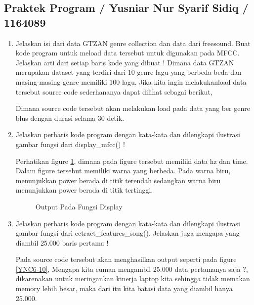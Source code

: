 \subsection{Praktek Program / Yusniar Nur Syarif Sidiq / 1164089}
\begin{enumerate}

\item Jelaskan isi dari data GTZAN genre collection dan data dari freesound. Buat kode program untuk meload data tersebut untuk digunakan pada MFCC. Jelaskan arti dari setiap baris kode yang dibuat !
	\subitem Dimana data GTZAN merupakan dataset yang terdiri dari 10 genre lagu yang berbeda beda dan masing-masing genre memiliki 100 lagu. Jika kita ingin melakukanload data tersebut source code sederhananya dapat dilihat sebagai berikut,
	
Dimana source code tersebut akan melakukan load pada data yang ber genre blus dengan durasi selama 30 detik.

\item Jelaskan perbaris kode program dengan kata-kata dan dilengkapi ilustrasi gambar fungsi dari display\_mfcc() !
	
	\subitem Perhatikan figure \ref{YNC6-9}, dimana pada figure tersebut memiliki data hz dan time. Dalam figure tersebut memiliki warna yang berbeda. Pada warna biru, menunjukkan power berada di titik terendah sedangkan warna biru menunjukkan power berada di titik tertinggi.

	\begin{figure}[!htbp]
		\caption{Output Pada Fungsi Display}
		\label{YNC6-9}
	\end{figure}

\item Jelaskan perbaris kode program dengan kata-kata dan dilengkapi ilustrasi gambar fungsi dari ectract\_features\_song(). Jelaskan juga mengapa yang diambil 25.000 baris pertama !
	
	\subitem Pada source code tersebut akan menghasilkan output seperti pada figure \ref{YNC6-10}, Mengapa kita cuman mengambil 25.000 data pertamanya saja ?, dikarenakan untuk meringankan kinerja laptop kita sehingga tidak memakan memory lebih besar, maka dari itu kita batasi data yang diambil hanya 25.000.


\end{enumerate}
